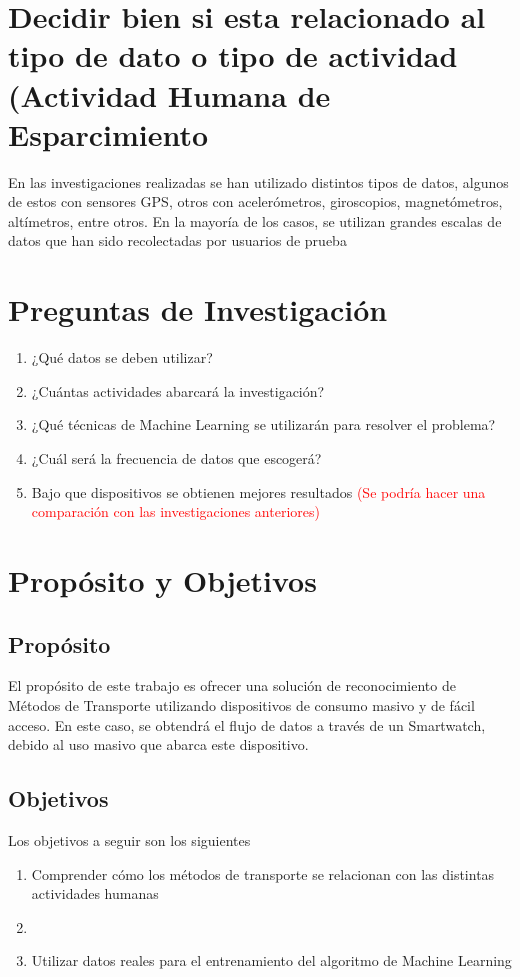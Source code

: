 \section{Decidir bien si esta relacionado al tipo de dato o tipo de actividad (Actividad Humana de Esparcimiento}

En las investigaciones realizadas se han utilizado distintos tipos de datos, algunos de estos con sensores GPS, otros con acelerómetros, giroscopios, magnetómetros, altímetros, entre otros. En la mayoría de los casos, se utilizan grandes escalas de datos que han sido recolectadas por usuarios de prueba

\section{Preguntas de Investigación}
\begin{enumerate}
	\item ¿Qué datos se deben utilizar?
	\item ¿Cuántas actividades abarcará la investigación?
	\item ¿Qué técnicas de Machine Learning se utilizarán para resolver el problema?
	\item ¿Cuál será la frecuencia de datos que escogerá?
	\item Bajo que dispositivos se obtienen mejores resultados \textcolor{red}{(Se podría hacer una comparación con las investigaciones anteriores)}
\end{enumerate}

\section{Propósito y Objetivos}
\subsection{Propósito}
El propósito de este trabajo es ofrecer una solución de reconocimiento de Métodos de Transporte utilizando dispositivos de consumo masivo y de fácil acceso. En este caso, se obtendrá el flujo de datos a través de un Smartwatch, debido al uso masivo que abarca este dispositivo.

\subsection{Objetivos}
Los objetivos a seguir son los siguientes
\begin{enumerate}
	\item Comprender cómo los métodos de transporte se relacionan con las distintas actividades humanas
	\item 
	\item Utilizar datos reales para el entrenamiento del algoritmo de Machine Learning
\end{enumerate} 

